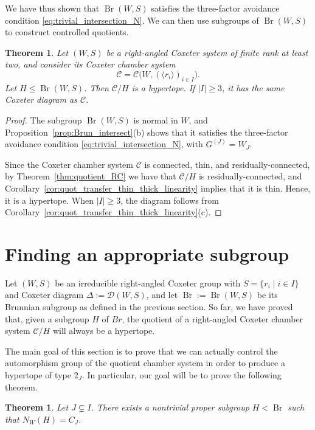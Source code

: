 \documentclass[11pt,letterpaper]{amsart}
\newtheorem{thm}[prop]{Theorem}
\newcommand{\CC}{\mathcal{C}}
\newcommand{\D}{\mathcal{D}}
\newcommand{\C}{\mathcal{C}}
\newcommand{\Br}{\operatorname{Br}}
\begin{document}
We have thus shown that $\Br(W,S)$ satisfies the three-factor avoidance condition \eqref{eq:trivial_intersection_N}. We can then use subgroups of $\Br(W,S)$ to construct controlled quotients.
\begin{thm}
\label{thm:Brunnian-hypertope}
Let $(W,S)$ be a right-angled Coxeter system of finite rank at least two, and
consider its Coxeter chamber system
\[
    \CC=\CC\bigl(W,(\langle r_i\rangle)_{i\in I}\bigr).
\]
Let $H\leq\Br(W,S)$.  Then $\CC/H$ is a hypertope.  If $|I|\geq 3$, it has the same Coxeter diagram as $\CC$.
\end{thm}

\begin{proof}
The subgroup $\Br(W,S)$ is normal in $W$, and
Proposition~\ref{prop:Brun_intersect}(b) shows that it satisfies the
three-factor avoidance condition \eqref{eq:trivial_intersection_N}, with
$G^{(J)}=W_J$.

Since the Coxeter chamber system $\CC$ is connected, thin, and residually-connected, by 
Theorem~\ref{thm:quotient_RC} we have that $\CC/H$ is residually-connected,
and Corollary~\ref{cor:quot_transfer_thin_thick_linearity} implies that it is
thin. Hence, it is a hypertope. When $|I|\geq 3$, the diagram follows from  Corollary~\ref{cor:quot_transfer_thin_thick_linearity}(c). 
\end{proof}


\section{Finding an appropriate subgroup}
\label{sec:AppropriateSub}

Let $(W,S)$ be an irreducible right-angled Coxeter group with $ S= \{r_i\mid i\in I\}$ and Coxeter diagram $\Delta:= \D(W,S)$, and let $\Br:=\Br(W,S)$ be its Brunnian subgroup as defined in the previous section. So far, we have proved that, given a subgroup $H$ of $Br$, the quotient of a right-angled Coxeter chamber system $\C/H$ will always be a hypertope.

The main goal of this section is to prove that we can actually control the automorphism group of the quotient chamber system in order to produce a hypertope of type $2_J$. In particular, our goal will be to prove the following theorem.

\begin{thm}\label{thm:prescribed-normalizer}
Let $J\subsetneq I$.  There exists a nontrivial proper subgroup $H<\Br$ such that $N_W(H)=C_J$.
\end{thm}
\end{document}
